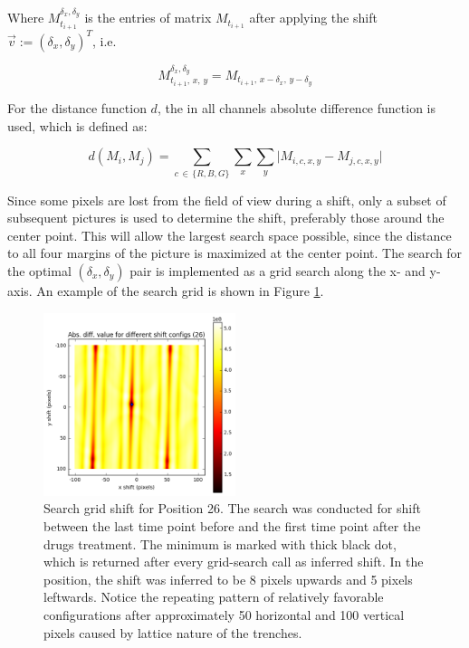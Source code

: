 \documentclass[pdftex,12pt,a4paper]{report}
\begin{document}
Where $M_{t_{i+1}}^{\delta_x, \delta_y}$ is the entries of matrix $M_{t_{i+1}}$ after applying the shift $\vec{v} := (\delta_x, \delta_y)^T$, i.e.

$$M_{t_{i+1}, \, x, \, y}^{\delta_x, \delta_y} = M_{t_{i+1}, \, x - \delta_x, \, y - \delta_y}$$

For the distance function $d$, the in all channels absolute difference function is used, which is defined as:

$$
d(M_i, M_j) = \sum_{c \, \in \, \{R, B, G\}} \sum_{x} \sum_{y} \vert M_{i, c, x, y} - M_{j, c, x, y} \vert
$$


Since some pixels are lost from the field of view during a shift, only a subset of subsequent pictures is used to determine the shift, preferably those around the center point. This will allow the largest search space possible, since the distance to all four margins of the picture is maximized at the center point. The search for the optimal $(\delta_x, \delta_y)$ pair is implemented as a grid search along the x- and y-axis. An example of the search grid is shown in Figure \ref{fig:searchgrid}.\\

\begin{figure}[H]
\centering
\includegraphics[width=0.5\textwidth]{images/search_grid}
\caption{Search grid shift for Position 26. The search was conducted for shift between the last time point before and the first time point after the drugs treatment. The minimum is marked with thick black dot, which is returned after every grid-search call as inferred shift. In the position, the shift was inferred to be 8 pixels upwards and 5 pixels leftwards. Notice the repeating pattern of relatively favorable configurations after approximately 50 horizontal and 100 vertical pixels caused by lattice nature of the trenches.}
\label{fig:searchgrid}
\end{figure}
\end{document}

